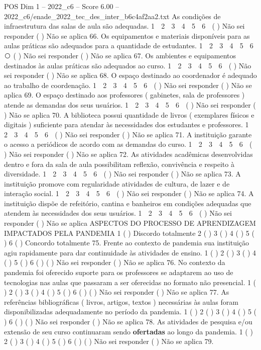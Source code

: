 \begin{textsample}{POS Dim 1 – 2022\_c6 – Score 6.00 – 2022\_c6/enade\_2022\_tec\_des\_inter\_b6c4af2aa2.txt}
As condições de infraestrutura das salas de aula são adequadas. 1 ⃝ 2 ⃝ 3 ⃝ 4 ⃝ 5 ⃝ 6 ⃝ ( ) Não sei responder ( ) Não se aplica 66.
Os equipamentos e materiais disponíveis para as aulas práticas são adequados para a quantidade de estudantes. 1 ⃝ 2 ⃝ 3 ⃝ 4 ⃝ 5 ⃝ 6 ⃝ ( ) Não sei responder ( ) Não se aplica 67.
Os ambientes e equipamentos destinados às aulas práticas são adequados ao curso. 1 ⃝ 2 ⃝ 3 ⃝ 4 ⃝ 5 ⃝ 6 ⃝ ( ) Não sei responder ( ) Não se aplica 68.
O espaço destinado ao coordenador é adequado ao trabalho de coordenação. 1 ⃝ 2 ⃝ 3 ⃝ 4 ⃝ 5 ⃝ 6 ⃝ ( ) Não sei responder ( ) Não se aplica 69.
O espaço destinado aos professores ( gabinetes, sala de professores ) atende as demandas dos seus usuários. 1 ⃝ 2 ⃝ 3 ⃝ 4 ⃝ 5 ⃝ 6 ⃝ ( ) Não sei responder ( ) Não se aplica 70.
A biblioteca possui quantidade de livros ( exemplares físicos e digitais ) suficiente para atendar às necessidades dos estudantes e professores. 1 ⃝ 2 ⃝ 3 ⃝ 4 ⃝ 5 ⃝ 6 ⃝ ( ) Não sei responder ( ) Não se aplica 71.
A instituição garante o acesso a periódicos de acordo com as demandas do curso. 1 ⃝ 2 ⃝ 3 ⃝ 4 ⃝ 5 ⃝ 6 ⃝ ( ) Não sei responder ( ) Não se aplica 72.
As atividades acadêmicas desenvolvidas dentro e fora da sala de aula possibilitam reflexão, convivência e respeito à diversidade. 1 ⃝ 2 ⃝ 3 ⃝ 4 ⃝ 5 ⃝ 6 ⃝ ( ) Não sei responder ( ) Não se aplica 73.
A instituição promove com regularidade atividades de cultura, de lazer e de interação social. 1 ⃝ 2 ⃝ 3 ⃝ 4 ⃝ 5 ⃝ 6 ⃝ ( ) Não sei responder ( ) Não se aplica 74.
A instituição dispõe de refeitório, cantina e banheiros em condições adequadas que atendem às necessidades dos seus usuários. 1 ⃝ 2 ⃝ 3 ⃝ 4 ⃝ 5 ⃝ 6 ⃝ ( ) Não sei responder ( ) Não se aplica ASPECTOS DO PROCESSO DE APRENDIZAGEM IMPACTADOS PELA PANDEMIA 1 ( ) Discordo totalmente 2 ( ) 3 ( ) 4 ( ) 5 ( ) 6 ( ) Concordo totalmente 75.
Frente ao contexto de pandemia sua instituição agiu rapidamente para dar continuidade às atividades de ensino. 1 ( ) 2 ( ) 3 ( ) 4 ( ) 5 ( ) 6 ( ) ( ) Não sei responder ( ) Não se aplica 76.
No contexto da pandemia foi oferecido suporte para os professores se adaptarem ao uso de tecnologias nas aulas que passaram a ser oferecidas no formato não presencial. 1 ( ) 2 ( ) 3 ( ) 4 ( ) 5 ( ) 6 ( ) ( ) Não sei responder ( ) Não se aplica 77.
As referências bibliográficas ( livros, artigos, textos ) necessárias às aulas foram disponibilizadas adequadamente no período da pandemia. 1 ( ) 2 ( ) 3 ( ) 4 ( ) 5 ( ) 6 ( ) ( ) Não sei responder ( ) Não se aplica 78.
As atividades de pesquisa e/ou extensão de seu curso continuaram sendo \textbf{ofertadas} ao longo da pandemia. 1 ( ) 2 ( ) 3 ( ) 4 ( ) 5 ( ) 6 ( ) ( ) Não sei responder ( ) Não se aplica 79.

\end{textsample}
